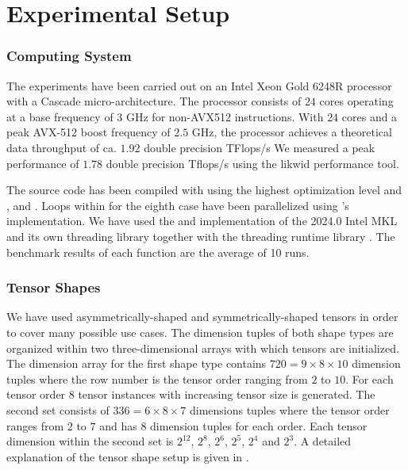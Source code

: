 \section{Experimental Setup}
\label{sec:experimental.setup}
\subsubsection{Computing System} 
The experiments have been carried out on an Intel Xeon Gold 6248R processor with a Cascade micro-architecture. The processor consists of $24$ cores operating at a base frequency of $3$ GHz for non-AVX512 instructions.
With $24$ cores and a peak AVX-512 boost frequency of $2.5$ GHz, the processor achieves a theoretical data throughput of ca. $1.92$ double precision TFlops/s
We measured a peak performance of $1.78$ double precision Tflops/s using the likwid performance tool.

The source code has been compiled with   using the highest optimization level  and ,  and . 
Loops within for the eighth case have been parallelized using 's   implementation.
We have used the  and  implementation of the 2024.0 Intel MKL and its own threading library  together with the threading runtime library .
The benchmark results of each function are the average of 10 runs.

\subsubsection{Tensor Shapes} 
We have used asymmetrically-shaped and symmetrically-shaped tensors in order to cover many possible use cases. 
The dimension tuples of both shape types are organized within two three-dimensional arrays with which tensors are initialized.
The dimension array for the first shape type contains $720 = 9\times 8 \times 10$ dimension tuples where the row number is the tensor order ranging from $2$ to $10$. 
For each tensor order $8$ tensor instances with increasing tensor size is generated.
The second set consists of $336 = 6\times8\times 7$ dimensions tuples where the tensor order ranges from $2$ to $7$ and has $8$ dimension tuples for each order.
Each tensor dimension within the second set is $2^{12}$, $2^{8}$, $2^{6}$, $2^5$, $2^4$ and $2^3$.
A detailed explanation of the tensor shape setup is given in \cite{bassoy:2019:ttv, bassoy:2018:fast}.

